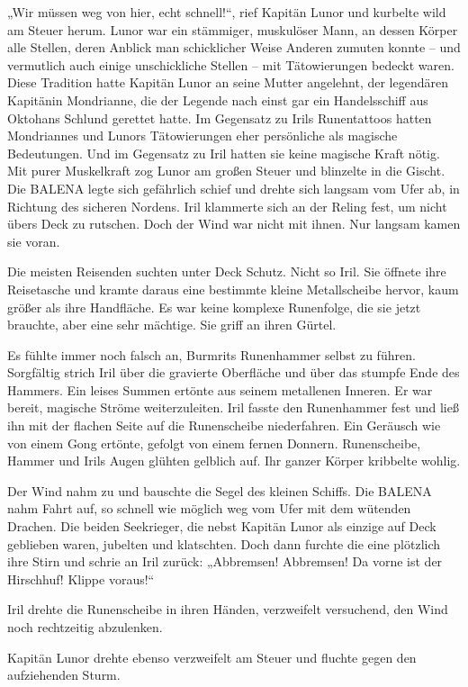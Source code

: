 „Wir müssen weg von hier, echt schnell!“, rief Kapitän Lunor und kurbelte wild am Steuer herum. Lunor war ein stämmiger, muskulöser Mann, an dessen Körper alle Stellen, deren Anblick man schicklicher Weise Anderen zumuten konnte – und vermutlich auch einige unschickliche Stellen – mit Tätowierungen bedeckt waren. Diese Tradition hatte Kapitän Lunor an seine Mutter angelehnt, der legendären Kapitänin Mondrianne, die der Legende nach einst gar ein Handelsschiff aus Oktohans Schlund gerettet hatte. Im Gegensatz zu Irils Runentattoos hatten Mondriannes und Lunors Tätowierungen eher persönliche als magische Bedeutungen. Und im Gegensatz zu Iril hatten sie keine magische Kraft nötig. Mit purer Muskelkraft zog Lunor am großen Steuer und blinzelte in die Gischt. Die BALENA legte sich gefährlich schief und drehte sich langsam vom Ufer ab, in Richtung des sicheren Nordens. Iril klammerte sich an der Reling fest, um nicht übers Deck zu rutschen. Doch der Wind war nicht mit ihnen. Nur langsam kamen sie voran.

Die meisten Reisenden suchten unter Deck Schutz. Nicht so Iril. Sie öffnete ihre Reisetasche und kramte daraus eine bestimmte kleine Metallscheibe hervor, kaum größer als ihre Handfläche. Es war keine komplexe Runenfolge, die sie jetzt brauchte, aber eine sehr mächtige. Sie griff an ihren Gürtel.

Es fühlte immer noch falsch an, Burmrits Runenhammer selbst zu führen. Sorgfältig strich Iril über die gravierte Oberfläche und über das stumpfe Ende des Hammers. Ein leises Summen ertönte aus seinem metallenen Inneren. Er war bereit, magische Ströme weiterzuleiten. Iril fasste den Runenhammer fest und ließ ihn mit der flachen Seite auf die Runenscheibe niederfahren. Ein Geräusch wie von einem Gong ertönte, gefolgt von einem fernen Donnern. Runenscheibe, Hammer und Irils Augen glühten gelblich auf. Ihr ganzer Körper kribbelte wohlig.

Der Wind nahm zu und bauschte die Segel des kleinen Schiffs. Die BALENA nahm Fahrt auf, so schnell wie möglich weg vom Ufer mit dem wütenden Drachen. Die beiden Seekrieger, die nebst Kapitän Lunor als einzige auf Deck geblieben waren, jubelten und klatschten. Doch dann furchte die eine plötzlich ihre Stirn und schrie an Iril zurück: „Abbremsen! Abbremsen! Da vorne ist der Hirschhuf! Klippe voraus!“

Iril drehte die Runenscheibe in ihren Händen, verzweifelt versuchend, den Wind noch rechtzeitig abzulenken.

Kapitän Lunor drehte ebenso verzweifelt am Steuer und fluchte gegen den aufziehenden Sturm.

